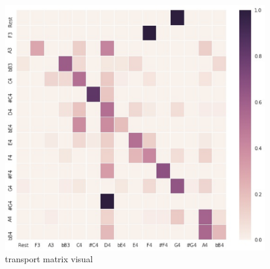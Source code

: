 \documentclass[11pt]{article}
\begin{document}
\begin{figure}[hptb]
	\centering
	\label{fig:transport_matrix_visual}
	\includegraphics[width=\textwidth]{pic/transport_matrix_visual.eps}
	\caption{transport matrix visual}
\end{figure}
\end{document}
